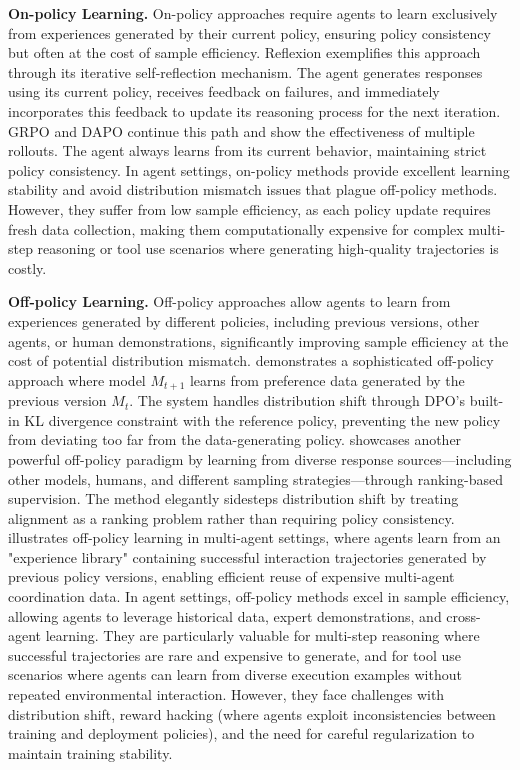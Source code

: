 \documentclass[10pt]{article} %
\begin{document}
\textbf{On-policy Learning.}
On-policy approaches require agents to learn exclusively from experiences generated by their current policy, ensuring policy consistency but often at the cost of sample efficiency. Reflexion \citep{shinn2023reflexion} exemplifies this approach through its iterative self-reflection mechanism. The agent generates responses using its current policy, receives feedback on failures, and immediately incorporates this feedback to update its reasoning process for the next iteration. GRPO \citep{shao2024deepseekmath} and DAPO \citep{yu2025dapo} continue this path and show the effectiveness of multiple rollouts. The agent always learns from its current behavior, maintaining strict policy consistency. In agent settings, on-policy methods provide excellent learning stability and avoid distribution mismatch issues that plague off-policy methods. However, they suffer from low sample efficiency, as each policy update requires fresh data collection, making them computationally expensive for complex multi-step reasoning or tool use scenarios where generating high-quality trajectories is costly.

\textbf{Off-policy Learning.}
Off-policy approaches allow agents to learn from experiences generated by different policies, including previous versions, other agents, or human demonstrations, significantly improving sample efficiency at the cost of potential distribution mismatch. 
 \cite{yuan2401self} demonstrates a sophisticated off-policy approach where model $M_{t+1}$ learns from preference data generated by the previous version $M_t$. The system handles distribution shift through DPO's built-in KL divergence constraint with the reference policy, preventing the new policy from deviating too far from the data-generating policy. 
\cite{yuan2023rrhf} showcases another powerful off-policy paradigm by learning from diverse response sources—including other models, humans, and different sampling strategies—through ranking-based supervision. The method elegantly sidesteps distribution shift by treating alignment as a ranking problem rather than requiring policy consistency. 
\cite{zhao2025sirius} illustrates off-policy learning in multi-agent settings, where agents learn from an "experience library" containing successful interaction trajectories generated by previous policy versions, enabling efficient reuse of expensive multi-agent coordination data. 
In agent settings, off-policy methods excel in sample efficiency, allowing agents to leverage historical data, expert demonstrations, and cross-agent learning. They are particularly valuable for multi-step reasoning where successful trajectories are rare and expensive to generate, and for tool use scenarios where agents can learn from diverse execution examples without repeated environmental interaction. However, they face challenges with distribution shift, reward hacking (where agents exploit inconsistencies between training and deployment policies), and the need for careful regularization to maintain training stability.
\end{document}
